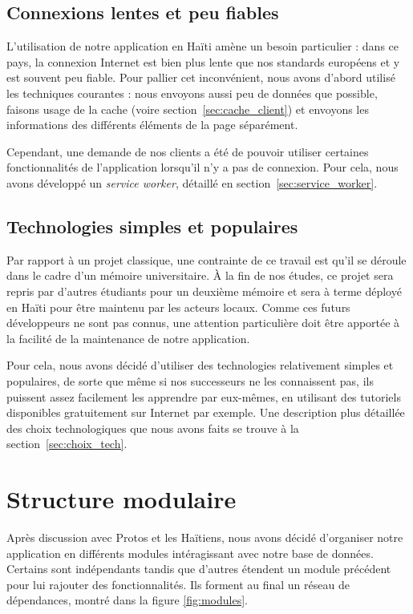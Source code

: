 \documentclass{EPL-master-thesis-covers-FR}
\begin{document}
			\subsection*{Connexions lentes et peu fiables}
				L'utilisation de notre application en Haïti amène un besoin particulier : dans ce pays, la connexion Internet est bien plus lente que nos standards européens et y est souvent peu fiable. Pour pallier cet inconvénient, nous avons d'abord utilisé les techniques courantes : nous envoyons aussi peu de données que possible, faisons usage de la cache (voire section~\ref{sec:cache_client}) et envoyons les informations des différents éléments de la page séparément.

				Cependant, une demande de nos clients a été de pouvoir utiliser certaines fonctionnalités de l'application lorsqu'il n'y a pas de connexion. Pour cela, nous avons développé un \emph{service worker}, détaillé en section~\ref{sec:service_worker}.

			\subsection*{Technologies simples et populaires}

				Par rapport à un projet classique, une contrainte de ce travail est qu'il se déroule dans le cadre d'un mémoire universitaire. À la fin de nos études, ce projet sera repris par d'autres étudiants pour un deuxième mémoire et sera à terme déployé en Haïti pour être maintenu par les acteurs locaux. Comme ces futurs développeurs ne sont pas connus, une attention particulière doit être apportée à la facilité de la maintenance de notre application.

				Pour cela, nous avons décidé d'utiliser des technologies relativement simples et populaires, de sorte que même si nos successeurs ne les connaissent pas, ils puissent assez facilement les apprendre par eux-mêmes, en utilisant des tutoriels disponibles gratuitement sur Internet par exemple. Une description plus détaillée des choix technologiques que nous avons faits se trouve à la section~\ref{sec:choix_tech}.

		\section{Structure modulaire}
			\label{sec:modules}


			Après discussion avec Protos et les Haïtiens, nous avons décidé d'organiser notre application en différents modules intéragissant avec notre base de données. Certains sont indépendants tandis que d'autres étendent un module précédent pour lui rajouter des fonctionnalités. Ils forment au final un réseau de dépendances, montré dans la figure \ref{fig:modules}.
\end{document}
